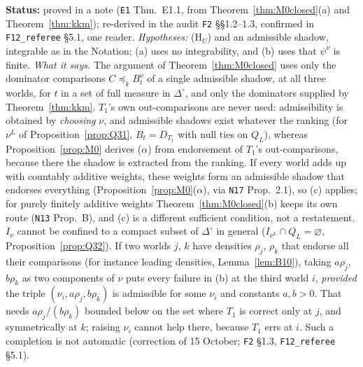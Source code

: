 \documentclass[11pt]{article}
\theoremstyle{definition}
\theoremstyle{remark}
\newcommand{\Di}{\Delta^{\circ}}
\newcommand{\src}[1]{\texttt{#1}}
\newcommand{\status}[1]{\par\smallskip\noindent\textbf{Status:} #1\par\smallskip}
\begin{document}
\status{proved in a note (\src{E1} Thm.~E1.1, from Theorem~\ref{thm:M0closed}(a) and Theorem~\ref{thm:kkm}); re-derived in the audit \src{F2} \S\S1.2--1.3, confirmed in \src{F12\_referee} \S5.1, one reader. \emph{Hypotheses:} (H$_U$) and an admissible shadow, integrable as in the Notation; (a) uses no integrability, and (b) uses that $\psi^\nu$ is finite. \emph{What it says.} The argument of Theorem~\ref{thm:M0closed} uses only the dominator comparisons $C\preceq_kB^\nu_t$ of a single admissible shadow, at all three worlds, for $t$ in a set of full measure in $\Di$, and only the dominators supplied by Theorem~\ref{thm:kkm}. $T_1$'s own out-comparisons are never used: admissibility is obtained by \emph{choosing} $\nu$, and admissible shadows exist whatever the ranking (for $\nu^L$ of Proposition~\ref{prop:Q31}, $B_t=D_{T_1}$ with null ties on $Q_L$), whereas Proposition~\ref{prop:M0} derives ($\alpha$) from endorsement of $T_1$'s out-comparisons, because there the shadow is extracted from the ranking. If every world adds up with countably additive weights, these weights form an admissible shadow that endorses everything (Proposition~\ref{prop:M0}($\alpha$), via \src{N17} Prop.~2.1), so (c) applies; for purely finitely additive weights Theorem~\ref{thm:M0closed}(b) keeps its own route (\src{N13} Prop.~B), and (c) is a different sufficient condition, not a restatement. $I_\nu$ cannot be confined to a compact subset of $\Di$ in general ($I_{\nu^L}\cap Q_L=\varnothing$, Proposition~\ref{prop:Q32}). If two worlds $j$, $k$ have densities $\rho_j$, $\rho_k$ that endorse all their comparisons (for instance leading densities, Lemma~\ref{lem:B10}), taking $a\rho_j$, $b\rho_k$ as two components of $\nu$ puts every failure in (b) at the third world $i$, \emph{provided} the triple $(\nu_i,a\rho_j,b\rho_k)$ is admissible for some $\nu_i$ and constants $a,b>0$. That needs $a\rho_j/(b\rho_k)$ bounded below on the set where $T_1$ is correct only at $j$, and symmetrically at $k$; raising $\nu_i$ cannot help there, because $T_1$ errs at $i$. Such a completion is not automatic (correction of 15 October; \src{F2} \S1.3, \src{F12\_referee} \S5.1).}
\end{document}
